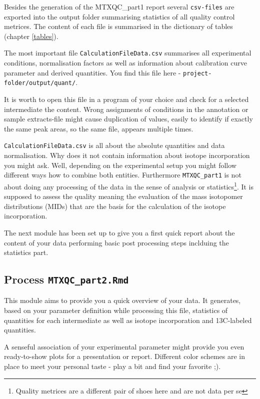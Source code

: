\documentclass[]{book}
\let\rmarkdownfootnote\footnote%
\def\footnote{\protect\rmarkdownfootnote}
\begin{document}
Besides the generation of the MTXQC\_part1 report several \texttt{csv-files} are exported into the output folder summarising statistics of all quality control metrices. The content of each file is summarised in the dictionary of tables (chapter \ref{tables}).

The most important file \texttt{CalculationFileData.csv} summarises all experimental conditions, normalisation factors as well as information about calibration curve parameter and derived quantities. You find this file here - \texttt{project-folder/output/quant/}.

It is worth to open this file in a program of your choice and check for a selected intermediate the content. Wrong assignments of conditions in the annotation or sample extracts-file might cause duplication of values, easily to identify if exactly the same peak areas, so the same file, appears multiple times.

\texttt{CalculationFileData.csv} is all about the absolute quantities and data normalisation. Why does it not contain information about isotope incorporation you might ask. Well, depending on the experimental setup you might follow different ways how to combine both entities. Furthermore \texttt{MTXQC\_part1} is not about doing any processing of the data in the sense of analysis or statistics\footnote{Quality metrices are a different pair of shoes here and are not data per se}. It is supposed to assess the quality meaning the evaluation of the mass isotopomer distributions (MIDs) that are the basis for the calculation of the isotope incorporation.

The next module has been set up to give you a first quick report about the content of your data performing basic post processing steps inclduing the statistics part.

\hypertarget{process-mtxqc_part2.rmd}{%
\subsection{\texorpdfstring{Process \texttt{MTXQC\_part2.Rmd}}{Process MTXQC\_part2.Rmd}}\label{process-mtxqc_part2.rmd}}

This module aims to provide you a quick overview of your data. It generates, based on your parameter definition while processing this file, statistics of quantities for each intermediate as well as isotope incorporation and 13C-labeled quantities.

A senseful association of your experimental parameter might provide you even ready-to-show plots for a presentation or report. Different color schemes are in place to meet your personal taste - play a bit and find your favorite ;).
\end{document}
